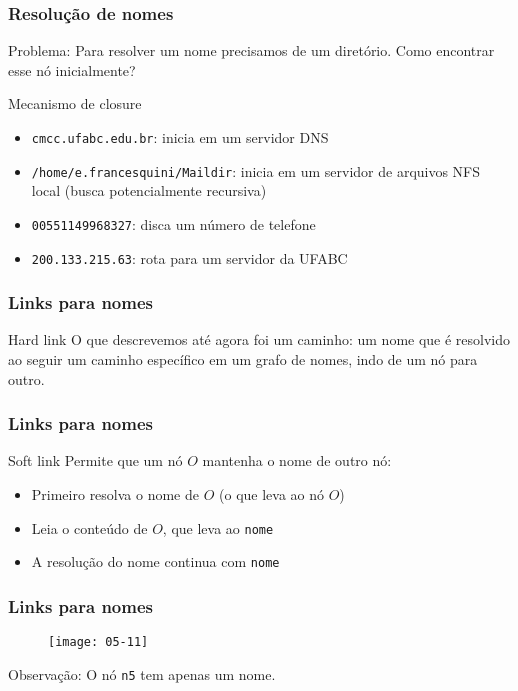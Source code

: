 \documentclass[Ligatures=TeX,table,brazil,svgnames,usetotalslideindicator,compress,10pt]{beamer}
\begin{document}
\begin{frame}
  \frametitle{Resolução de nomes}
  \begin{alertblock}{Problema:}
    Para resolver um nome precisamos de um diretório. Como encontrar esse nó inicialmente?
  \end{alertblock}

  \begin{block}{Mecanismo de closure}
    \begin{itemize}
      \item \texttt{cmcc.ufabc.edu.br}: inicia em um servidor DNS
  \item \texttt{/home/e.francesquini/Maildir}: inicia em um servidor de arquivos NFS local (busca potencialmente recursiva)
  \item \texttt{00551149968327}: disca um número de telefone
  \item \texttt{200.133.215.63}: rota para um servidor da UFABC
    \end{itemize}
  \end{block}

\end{frame}

\begin{frame}
  \frametitle{Links para nomes}
  \begin{block}{Hard link}
    O que descrevemos até agora foi um \alert{caminho}: um nome que é resolvido ao seguir um caminho específico em um grafo de nomes, indo de um nó para outro.
  \end{block}
\end{frame}

\begin{frame}
  \frametitle{Links para nomes}
  \begin{block}{Soft link}
    Permite que um nó $O$ mantenha o \alert{nome} de outro nó:
    \begin{itemize}
    \item Primeiro resolva o nome de $O$ (o que leva ao nó $O$)
    \item Leia o conteúdo de $O$, que leva ao \texttt{nome}
    \item A resolução do nome continua com \texttt{nome}
    \end{itemize}
  \end{block}
\end{frame}

\begin{frame}
  \frametitle{Links para nomes}
  \begin{figure}
    \centering
    \texttt{[image: 05-11]}
  \end{figure}

  \begin{alertblock}{Observação:}
    O nó \texttt{n5} tem apenas um nome.
  \end{alertblock}

\end{frame}
\end{document}

